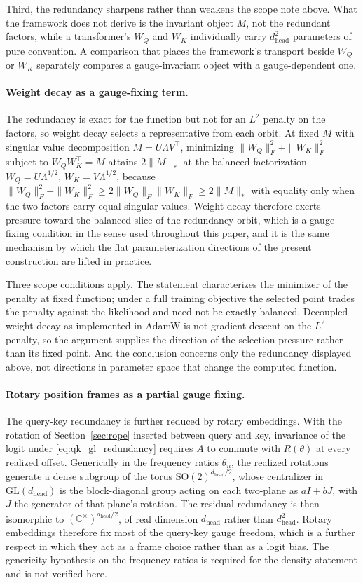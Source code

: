 \documentclass[twoside,11pt]{article}
\begin{document}
Third, the redundancy sharpens rather than weakens the scope note above. What the framework does not derive is the invariant object $M$, not the redundant factors, while a transformer's $W_Q$ and $W_K$ individually carry $d_{\text{head}}^2$ parameters of pure convention. A comparison that places the framework's transport beside $W_Q$ or $W_K$ separately compares a gauge-invariant object with a gauge-dependent one.

\paragraph{Weight decay as a gauge-fixing term.}
The redundancy is exact for the function but not for an $L^2$ penalty on the factors, so weight decay selects a representative from each orbit. At fixed $M$ with singular value decomposition $M = U\Lambda V^\top$, minimizing $\|W_Q\|_F^2 + \|W_K\|_F^2$ subject to $W_QW_K^\top = M$ attains $2\|M\|_*$ at the balanced factorization $W_Q = U\Lambda^{1/2}$, $W_K = V\Lambda^{1/2}$, because $\|W_Q\|_F^2 + \|W_K\|_F^2 \geq 2\|W_Q\|_F\|W_K\|_F \geq 2\|M\|_*$ with equality only when the two factors carry equal singular values. Weight decay therefore exerts pressure toward the balanced slice of the redundancy orbit, which is a gauge-fixing condition in the sense used throughout this paper, and it is the same mechanism by which the flat parameterization directions of the present construction are lifted in practice.

Three scope conditions apply. The statement characterizes the minimizer of the penalty at fixed function; under a full training objective the selected point trades the penalty against the likelihood and need not be exactly balanced. Decoupled weight decay as implemented in AdamW is not gradient descent on the $L^2$ penalty, so the argument supplies the direction of the selection pressure rather than its fixed point. And the conclusion concerns only the redundancy displayed above, not directions in parameter space that change the computed function.

\paragraph{Rotary position frames as a partial gauge fixing.}
The query-key redundancy is further reduced by rotary embeddings. With the rotation of Section~\ref{sec:rope} inserted between query and key, invariance of the logit under \eqref{eq:qk_gl_redundancy} requires $A$ to commute with $R(\theta)$ at every realized offset. Generically in the frequency ratios $\theta_n$, the realized rotations generate a dense subgroup of the torus $\mathrm{SO}(2)^{d_{\text{head}}/2}$, whose centralizer in $\mathrm{GL}(d_{\text{head}})$ is the block-diagonal group acting on each two-plane as $aI + bJ$, with $J$ the generator of that plane's rotation. The residual redundancy is then isomorphic to $(\mathbb{C}^\times)^{d_{\text{head}}/2}$, of real dimension $d_{\text{head}}$ rather than $d_{\text{head}}^2$. Rotary embeddings therefore fix most of the query-key gauge freedom, which is a further respect in which they act as a frame choice rather than as a logit bias. The genericity hypothesis on the frequency ratios is required for the density statement and is not verified here.
\end{document}
